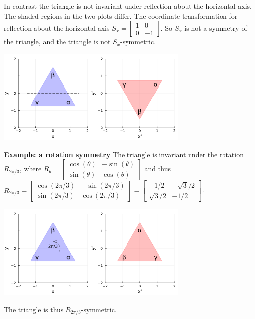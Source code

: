 \documentclass[letter]{article}
\newcommand{\Sx}{S_x}
\begin{document}
\vspace{6mm}
In contrast the triangle is not invariant under reflection about the horizontal axis. The shaded 
regions in the two plots differ. The coordinate transformation for reflection about the horizontal
axis $\Sx = \begin{bmatrix} 1 & 0 \\ 0 & -1 \end{bmatrix}$. So $\Sx$ is not a symmetry
of the triangle, and the triangle is not $\Sx$-symmetric.
\begin{center}
\includegraphics[width=0.7\textwidth]{triangle-sy.png}
\end{center}

\vspace{6mm}
{\bf Example: a rotation symmetry}
The triangle is invariant under the rotation $R_{2\pi/3}$, where
$R_{\theta} = \begin{bmatrix} \cos(\theta) & -\sin(\theta) \\ \sin(\theta) & \cos(\theta) \end{bmatrix}$
and thus 
$R_{2\pi/3} = \begin{bmatrix} \cos(2\pi/3) & -\sin(2\pi/3) \\ \sin(2\pi/3) & \cos(2\pi/3) \end{bmatrix}
= \begin{bmatrix} -1/2 & -\sqrt{3}/2 \\ \sqrt{3}/2 & -1/2 \end{bmatrix}$.
\begin{center}
\includegraphics[width=0.7\textwidth]{triangle-R.png}
\end{center}
The triangle is thus $R_{2\pi/3}$-symmetric.
\end{document}
